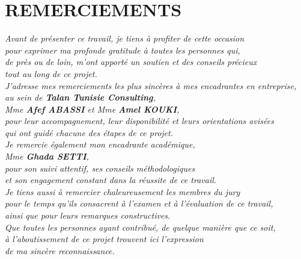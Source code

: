 \chapter*{REMERCIEMENTS}
\thispagestyle{MyStyle}

\vspace*{1.5cm}
\begin{center}
{\large\itshape%
Avant de présenter ce travail, je tiens à profiter de cette occasion\\
pour exprimer ma profonde gratitude à toutes les personnes qui,\\
de près ou de loin, m'ont apporté un soutien et des conseils précieux\\
tout au long de ce projet.\\[1em]
J'adresse mes remerciements les plus sincères à mes encadrantes en entreprise,\\
au sein de \textbf{Talan Tunisie Consulting},\\
Mme \textbf{Afef ABASSI} et Mme \textbf{Amel KOUKI},\\
pour leur accompagnement, leur disponibilité et leurs orientations avisées\\
qui ont guidé chacune des étapes de ce projet.\\[1em]
Je remercie également mon encadrante académique,\\
Mme \textbf{Ghada SETTI},\\
pour son suivi attentif, ses conseils méthodologiques\\
et son engagement constant dans la réussite de ce travail.\\[1em]
Je tiens aussi à remercier chaleureusement les membres du jury\\
pour le temps qu'ils consacrent à l'examen et à l'évaluation de ce travail,\\
ainsi que pour leurs remarques constructives.\\[1em]
Que toutes les personnes ayant contribué, de quelque manière que ce soit,\\
à l'aboutissement de ce projet trouvent ici l'expression\\
de ma sincère reconnaissance.
}
\end{center}

